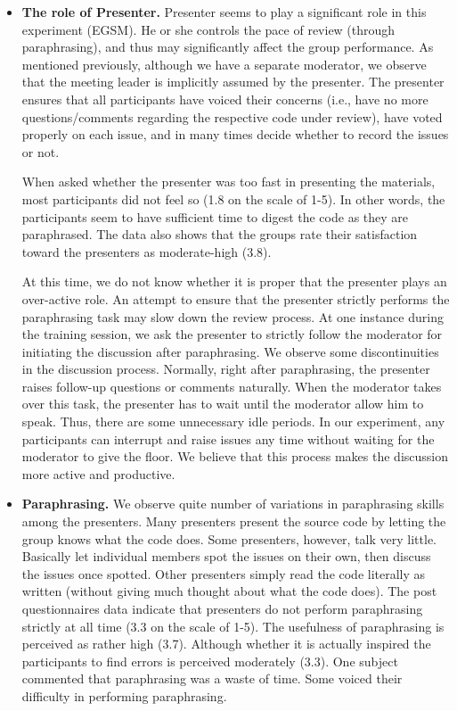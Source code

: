 \begin{itemize}
\item {\bf The role of Presenter.}
Presenter seems to play a significant role in this experiment
(EGSM). He or she 
controls the pace of review (through paraphrasing), and thus may
significantly affect the group performance. 
As mentioned previously, although we have a separate moderator, we
observe that the meeting leader is implicitly assumed by the
presenter. The presenter ensures that all participants have voiced
their concerns (i.e., have no more questions/comments regarding the
respective code 
under review), have voted properly on each issue, and in many times
decide whether to record the issues or not.

When asked whether the presenter was too fast in presenting the
materials, most participants did not feel so (1.8 on the scale of
1-5). In other words, the participants seem to have sufficient time to
digest the code as they are paraphrased. 
The data also shows that the groups rate their satisfaction toward the 
presenters as moderate-high (3.8).  

At this time, we do not know whether it is proper that the
presenter plays an over-active role. An attempt to ensure that the
presenter strictly performs the paraphrasing task may slow  down the
review process. At one instance during the training session, we ask the
presenter to strictly follow the moderator for initiating the
discussion after paraphrasing. We observe some discontinuities in the
discussion process. Normally, right after paraphrasing, the presenter
raises follow-up questions or comments naturally. When the moderator
takes over this task, the presenter has to wait until the moderator
allow him to speak. Thus, there are some unnecessary idle periods.
In our experiment, any participants can interrupt and raise issues
any time without waiting for the moderator to give the floor. We
believe that this process makes the discussion more active and
productive. 


\item {\bf Paraphrasing.}
We observe quite number of variations in paraphrasing skills among the 
presenters. Many presenters present the source code by letting the group
knows what the code does. Some presenters, however, talk very
little. Basically let individual members spot the issues on their own,
then discuss the  
issues once spotted. Other presenters simply read the code literally
as written (without giving much thought about what the code
does). 
The post questionnaires data indicate that presenters do not 
perform paraphrasing strictly at all time (3.3 on the scale of 1-5). 
The usefulness of paraphrasing is perceived as rather high
(3.7). Although whether it is actually inspired the participants to
find errors is perceived moderately (3.3).
One subject commented that paraphrasing was a waste of time. Some
voiced their difficulty in performing paraphrasing.


\end{itemize}
